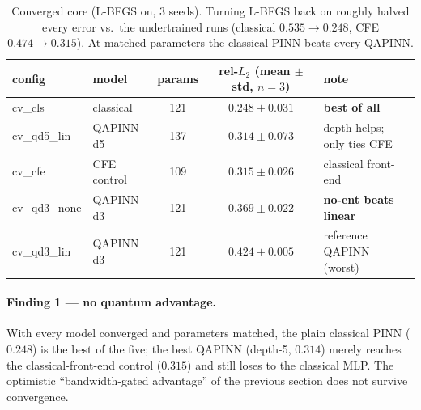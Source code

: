 \documentclass[11pt]{article}
\begin{document}
\begin{table}[h]\centering\small
\begin{tabular}{llcc l}
\toprule
config & model & params & rel-$L_2$ (mean $\pm$ std, $n{=}3$) & note \\ \midrule
cv\_cls      & classical    & 121 & $\mathbf{0.248 \pm 0.031}$ & \textbf{best of all} \\
cv\_qd5\_lin & QAPINN d5    & 137 & $0.314 \pm 0.073$ & depth helps; only ties CFE \\
cv\_cfe      & CFE control  & 109 & $0.315 \pm 0.026$ & classical front-end \\
cv\_qd3\_none& QAPINN d3    & 121 & $0.369 \pm 0.022$ & \textbf{no-ent beats linear} \\
cv\_qd3\_lin & QAPINN d3    & 121 & $0.424 \pm 0.005$ & reference QAPINN (worst) \\
\bottomrule
\end{tabular}
\caption{Converged core (L-BFGS on, 3 seeds). Turning L-BFGS back on roughly halved
every error vs.\ the undertrained runs (classical $0.535\!\to\!0.248$, CFE
$0.474\!\to\!0.315$). At matched parameters the classical PINN beats every QAPINN.}
\label{tab:converged}
\end{table}

\paragraph{Finding 1 --- no quantum advantage.} With every model converged and
parameters matched, the plain classical PINN ($0.248$) is the best of the five; the
best QAPINN (depth-5, $0.314$) merely reaches the classical-front-end control
($0.315$) and still loses to the classical MLP. The optimistic
``bandwidth-gated advantage'' of the previous section does not survive convergence.
\end{document}

